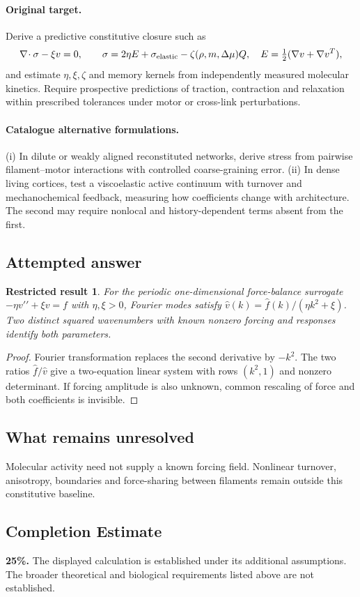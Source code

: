 \documentclass[11pt]{article}
\newtheorem{attemptresult}{Restricted result}[section]
\begin{document}
\paragraph{Original target.}
Derive a predictive constitutive closure such as
\[\nabla\!\cdot\sigma-\xi v=0,\qquad \sigma=2\eta E+\sigma_{\rm elastic}-\zeta(\rho,m,\Delta\mu)Q,\quad E=\tfrac12(\nabla v+\nabla v^T),\]
and estimate $\eta,\xi,\zeta$ and memory kernels from independently measured molecular kinetics. Require prospective predictions of traction, contraction and relaxation within prescribed tolerances under motor or cross-link perturbations.
\paragraph{Catalogue alternative formulations.}
(i) In dilute or weakly aligned reconstituted networks, derive stress from pairwise filament--motor interactions with controlled coarse-graining error. (ii) In dense living cortices, test a viscoelastic active continuum with turnover and mechanochemical feedback, measuring how coefficients change with architecture. The second may require nonlocal and history-dependent terms absent from the first.
\subsection{Attempted answer}
\begin{attemptresult}
For the periodic one-dimensional force-balance surrogate $-\eta v\prime\prime+\xi v=f$ with $\eta,\xi>0$, Fourier modes satisfy $\widehat v(k)=\widehat f(k)/(\eta k^2+\xi)$. Two distinct squared wavenumbers with known nonzero forcing and responses identify both parameters.
\end{attemptresult}
\begin{proof}
Fourier transformation replaces the second derivative by $-k^2$. The two ratios $\widehat f/\widehat v$ give a two-equation linear system with rows $(k^2,1)$ and nonzero determinant. If forcing amplitude is also unknown, common rescaling of force and both coefficients is invisible.
\end{proof}
\subsection{What remains unresolved}
Molecular activity need not supply a known forcing field. Nonlinear turnover, anisotropy, boundaries and force-sharing between filaments remain outside this constitutive baseline.
\subsection{Completion Estimate}
\textbf{25\%.} The displayed calculation is established under its additional assumptions. The broader theoretical and biological requirements listed above are not established.
\end{document}
